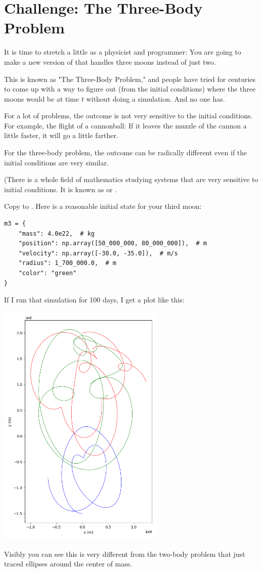 \section{Challenge: The Three-Body Problem}

It is time to stretch a little as a physicist and programmer:  You are going to make a new version of  that handles three moons instead of just two.

This is known as "The Three-Body Problem," and people have tried for centuries to come up with 
a way to figure out (from the initial conditions) where the three moons would be at time $t$ without doing a simulation.  And no one has.

For a lot of problems,  the outcome is not very sensitive to the initial conditions.   For example,  the flight of a
cannonball:  If it leaves the muzzle of the cannon a little faster,  it will go a little farther.

For the three-body problem,  the outcome can be radically different even if the initial conditions are very similar.  

(There is a whole field of mathematics studying systems that are very sensitive to initial conditions.  It is known
as  or .

Copy   to .  Here is a reasonable initial state for your third moon:

\begin{verbatim}
m3 = {
    "mass": 4.0e22,  # kg
    "position": np.array([50_000_000, 80_000_000]),  # m
    "velocity": np.array([-30.0, -35.0]),  # m/s
    "radius": 1_700_000.0,  # m
    "color": "green" 
}  
\end{verbatim}

If I run that simulation for 100 days,  I get a plot like this:

\includegraphics[width=0.6\textwidth]{plot3moons_01.png}

Visibly you can see this is very different from the two-body problem that just traced ellipses around the center of mass.




